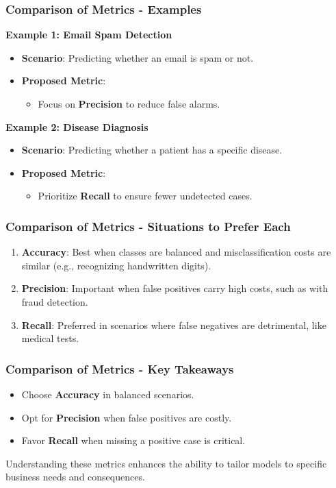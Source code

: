 \documentclass[aspectratio=169]{beamer}
\begin{document}
\begin{frame}[fragile]
    \frametitle{Comparison of Metrics - Examples}
    \textbf{Example 1: Email Spam Detection}
    \begin{itemize}
        \item \textbf{Scenario}: Predicting whether an email is spam or not.
        \item \textbf{Proposed Metric}:
            \begin{itemize}
                \item Focus on \textbf{Precision} to reduce false alarms.
            \end{itemize}
    \end{itemize}

    \textbf{Example 2: Disease Diagnosis}
    \begin{itemize}
        \item \textbf{Scenario}: Predicting whether a patient has a specific disease.
        \item \textbf{Proposed Metric}:
            \begin{itemize}
                \item Prioritize \textbf{Recall} to ensure fewer undetected cases.
            \end{itemize}
    \end{itemize}
\end{frame}

\begin{frame}[fragile]
    \frametitle{Comparison of Metrics - Situations to Prefer Each}
    \begin{enumerate}
        \item \textbf{Accuracy}: Best when classes are balanced and misclassification costs are similar (e.g., recognizing handwritten digits).
        \item \textbf{Precision}: Important when false positives carry high costs, such as with fraud detection.
        \item \textbf{Recall}: Preferred in scenarios where false negatives are detrimental, like medical tests.
    \end{enumerate}
\end{frame}

\begin{frame}[fragile]
    \frametitle{Comparison of Metrics - Key Takeaways}
    \begin{itemize}
        \item Choose \textbf{Accuracy} in balanced scenarios.
        \item Opt for \textbf{Precision} when false positives are costly.
        \item Favor \textbf{Recall} when missing a positive case is critical.
    \end{itemize}
    Understanding these metrics enhances the ability to tailor models to specific business needs and consequences.
\end{frame}
\end{document}
